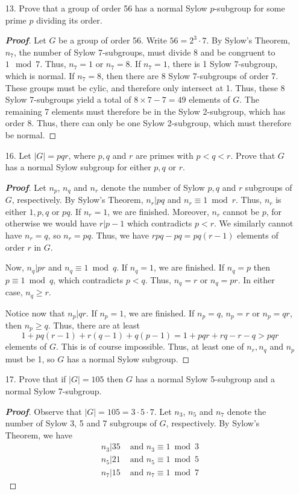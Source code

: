 \documentclass[12pt,leqno]{book}
\theoremstyle{definition}
\newenvironment{Proof}{\begin{proof}[\textnormal{\textbf{Proof}}]}{\end{proof}}
\begin{document}
\begin{enumerate}
 \item [13.] Prove that a group of order 56 has a normal Sylow $p$-subgroup for some prime $p$ dividing its order.
\begin{Proof}
 Let $G$ be a group of order 56. Write $56=2^3\cdot7$. By Sylow's Theorem, $n_7$, the number of Sylow 7-subgroups, must divide $8$ and be congruent to $1\mod7$. Thus, $n_7=1$ or $n_7=8$. If $n_7=1$, there is 1 Sylow 7-subgroup, which is normal. If $n_7=8$, then there are 8 Sylow 7-subgroups of order 7. These groups must be cylic, and therefore only intersect at 1. Thus, these 8 Sylow 7-subgroups yield a total of $8\times7-7=49$ elements of $G$. The remaining 7 elements must therefore be in the Sylow 2-subgroup, which has order 8. Thus, there can only be one Sylow 2-subgroup, which must therefore be normal.
\end{Proof}

 \item [16.] Let $|G|=pqr$, where $p,q$ and $r$ are primes with $p<q<r$. Prove that $G$ has a normal Sylow subgroup for either $p,q$ or $r$.
\begin{Proof}
 Let $n_p$, $n_q$ and $n_r$ denote the number of Sylow $p,q$ and $r$ subgroups of $G$, respectively. By Sylow's Theorem, $n_r|pq$ and $n_r\equiv1\bmod{r}$. Thus, $n_r$ is either $1,p,q$ or $pq$. If $n_r=1$, we are finished. Moreover, $n_r$ cannot be $p$, for otherwise we would have $r|p-1$ which contradicts $p<r$. We similarly cannot have $n_r=q$, so $n_r=pq$. Thus, we have $rpq-pq=pq(r-1)$ elements of order $r$ in $G$. 

Now, $n_q|pr$ and $n_q\equiv1\bmod{q}$. If $n_q=1$, we are finished. If $n_q=p$ then $p\equiv1\bmod{q}$, which contradicts $p<q$. Thus, $n_q=r$ or $n_q=pr$. In either case, $n_q\geq r$.

Notice now that $n_p|qr$. If $n_p=1$, we are finished. If $n_p=q$, $n_p=r$ or $n_p=qr$, then $n_p\geq q$. Thus, there are at least \[1+pq(r-1)+r(q-1)+q(p-1)=1+pqr+rq-r-q>pqr\] elements of $G$. This is of course impossible. Thus, at least one of $n_r,n_q$ and $n_p$ must be 1, so $G$ has a normal Sylow subgroup.
\end{Proof}
 \item [17.] Prove that if $|G|=105$ then $G$ has a normal Sylow 5-subgroup and a normal Sylow 7-subgroup.
\begin{Proof}
 Observe that $|G|=105=3\cdot5\cdot7$. Let $n_3$, $n_5$ and $n_7$ denote the number of Sylow 3, 5 and 7 subgroups of $G$, respectively. By Sylow's Theorem, we have \begin{align*}n_3|35&\text{ and }n_3\equiv1\bmod{3}\\n_5|21&\text{  and  }n_5\equiv1\bmod{5}\\n_7|15&\text{  and  }n_7\equiv1\bmod{7}\end{align*}


\end{Proof}
\end{enumerate}
\end{document}
